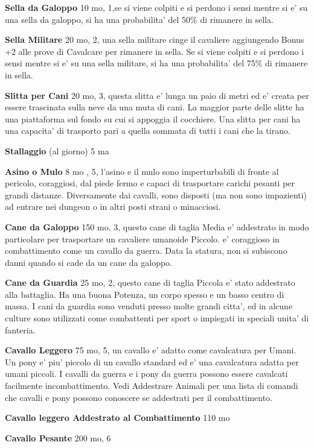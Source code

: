 \documentclass[a4paper,11pt,twoside,openany]{book}
\begin{document}
{		\textbf{Sella da Galoppo} 10 mo, 1,se si viene colpiti e si perdono i sensi mentre si e' su una sella da galoppo, si ha una probabilita' del 50\% di rimanere in sella.
		
		\textbf{Sella Militare} 20 mo, 2, una sella militare cinge il cavaliere aggiungendo Bonus +2 alle prove di Cavalcare per rimanere in sella. Se si viene colpiti e si perdono i sensi mentre si e' su una sella militare, si ha una probabilita' del 75\% di rimanere in sella.
		
		\textbf{Slitta per Cani} 20 mo, 3, questa slitta e' lunga un paio di metri ed e' creata per essere trascinata sulla neve da una muta di cani. La maggior parte delle slitte ha una piattaforma sul fondo su cui si appoggia il cocchiere.
		Una slitta per cani ha una capacita' di trasporto pari a quella sommata di tutti i cani che la tirano.
		
		\textbf{Stallaggio} (al giorno) 5 ma 
		
		\textbf{Asino o Mulo} 8 mo , 5, l'asino e il mulo sono imperturbabili di fronte al pericolo, coraggiosi, dal piede fermo e capaci di trasportare carichi pesanti per grandi distanze. Diversamente dai cavalli, sono disposti (ma non sono impazienti) ad entrare nei dungeon o in altri posti strani o minacciosi.
		
		\textbf{Cane da Galoppo} 150 mo, 3, questo cane di taglia Media e' addestrato in modo particolare per trasportare un cavaliere umanoide Piccolo. e' coraggioso in combattimento come un cavallo da guerra. Data la statura, non si subiscono danni quando si cade da un cane da galoppo.
		
		\textbf{Cane da Guardia} 25 mo, 2, questo cane di taglia Piccola e' stato addestrato alla battaglia. Ha una buona Potenza, un corpo spesso e un basso centro di massa. I cani da guardia sono venduti presso molte grandi citta', ed in alcune culture sono utilizzati come combattenti per sport o impiegati in speciali unita' di fanteria.
		
		\textbf{Cavallo Leggero} 75 mo, 5, un cavallo e' adatto come cavalcatura per Umani. Un pony e' piu' piccolo di un cavallo standard ed e' una cavalcatura adatta per umani piccoli. I cavalli da guerra e i pony da guerra possono essere cavalcati facilmente incombattimento.
		Vedi Addestrare Animali per una lista di comandi che cavalli e pony possono conoscere se addestrati per il combattimento.
		
		\textbf{Cavallo leggero Addestrato al Combattimento} 110 mo
		
		\textbf{Cavallo Pesante} 200 mo, 6
		
}
\end{document}
